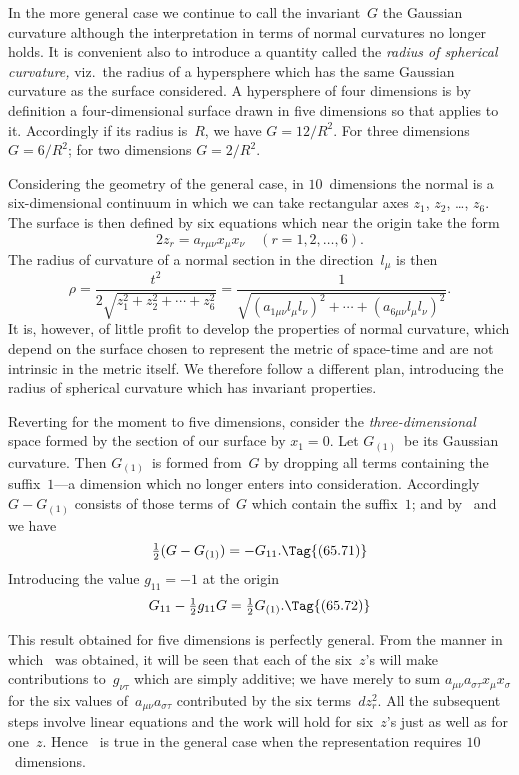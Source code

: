 \documentclass[12pt]{book}
\begin{document}
In the more general case we continue to call the invariant~$G$ the Gaussian
curvature although the interpretation in terms of normal curvatures no longer
%
holds. It is convenient also to introduce a quantity called the \emph{radius of
spherical curvature,} viz.\ the radius of a hypersphere which has the same
%
Gaussian curvature as the surface considered\footnotemark.\footnotetext
  {A hypersphere of four dimensions is by definition a four\hyp{}dimensional surface drawn in five
  dimensions so that  applies to it. Accordingly if its radius is~$R$, we have $G = 12/R^{2}$. For
  three dimensions $G = 6/R^{2}$; for two dimensions $G = 2/R^{2}$.}

Considering the geometry of the general case, in $10$~dimensions the normal is
a six\hyp{}dimensional continuum in which we can take rectangular axes $z_{1}$, $z_{2}$, \dots, $z_{6}$.
The surface is then defined by six equations which near the origin take the
form
\[
2z_{r} = a_{r\mu\nu} x_{\mu} x_{\nu}\quad (r = 1, 2, \dots, 6).
\]
The radius of curvature of a normal section in the direction~$l_{\mu}$ is then
\[
\rho = \frac{t^{2}}{2\sqrt{z_{1}^{2} + z_{2}^{2} + \cdots + z_{6}^{2}}}
 = \frac{1}{\sqrt{(a_{1\mu\nu} l_{\mu} l_{\nu})^{2} + \cdots + (a_{6\mu\nu} l_{\mu} l_{\nu})^{2}}}.
\]
It is, however, of little profit to develop the properties of normal curvature,
which depend on the surface chosen to represent the metric of space-time
and are not intrinsic in the metric itself. We therefore follow a different plan,
introducing the radius of spherical curvature which has invariant properties.

Reverting for the moment to five dimensions, consider the \emph{three\hyp{}dimensional}
space formed by the section of our surface by $x_{1} = 0$. Let $G_{(1)}$~be its Gaussian
curvature. Then $G_{(1)}$~is formed from~$G$ by dropping all terms containing the
%
suffix~$1$---a dimension which no longer enters into consideration. Accordingly
$G - G_{(1)}$ consists of those terms of~$G$ which contain the suffix~$1$; and by~
and~ we have
\[
\tfrac{1}{2}(G - G_{(1)}) = -G_{11}.
\Tag{(65.71)}
\]
Introducing the value $g_{11} = -1$ at the origin
\[
G_{11} - \tfrac{1}{2}g_{11} G = \tfrac{1}{2}G_{(1)}.
\Tag{(65.72)}
\]

This result obtained for five dimensions is perfectly general. From the
manner in which ~was obtained, it will be seen that each of the six~$z$'s will
make contributions to~$g_{\nu\tau}$ which are simply additive; we have merely to sum
$a_{\mu\nu} a_{\sigma\tau} x_{\mu} x_{\sigma}$ for the six values of~$a_{\mu\nu} a_{\sigma\tau}$ contributed by the six terms~$dz_{r}^{2}$. All the
subsequent steps involve linear equations and the work will hold for six~$z$'s
just as well as for one~$z$. Hence ~is true in the general case when the
representation requires $10$~dimensions.
\end{document}
